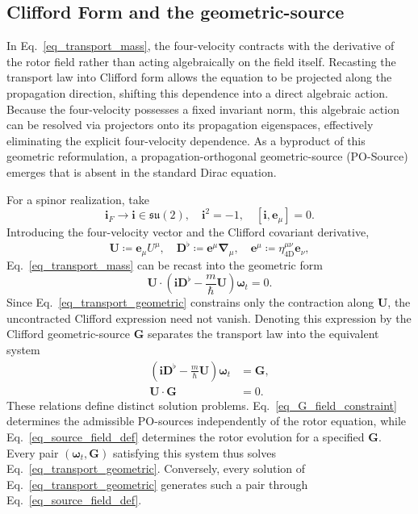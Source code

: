 \subsection{Clifford Form and the geometric-source}
In Eq.~\eqref{eq_transport_mass}, the four-velocity contracts with the derivative of the rotor field rather than acting algebraically on the field itself. Recasting the transport law into Clifford form allows the equation to be projected along the propagation direction, shifting this dependence into a direct algebraic action. Because the four-velocity possesses a fixed invariant norm, this algebraic action can be resolved via projectors onto its propagation eigenspaces, effectively eliminating the explicit four-velocity dependence. As a byproduct of this geometric reformulation, a propagation-orthogonal geometric-source (PO-Source) emerges that is absent in the standard Dirac equation.

For a spinor realization, take
\begin{equation}
    \mathbf{i}_{F} \to \mathbf{i}\in\mathfrak{su}(2),\quad \mathbf{i}^{2} = -1,\quad [\mathbf{i}, \mathbf{e}_{\mu}] = 0.
\end{equation}
Introducing the four-velocity vector and the Clifford covariant derivative,
\begin{equation}
    \mathbf{U} \coloneqq \mathbf{e}_{\mu}U^{\mu},\quad \mathbf{D}^{\flat} \coloneqq \mathbf{e}^{\mu}\boldsymbol{\nabla}_{\mu},\quad \mathbf{e}^{\mu} \coloneqq \eta_{\mathrm{4D}}^{\mu\nu}\mathbf{e}_{\nu},
\end{equation}
Eq.~\eqref{eq_transport_mass} can be recast into the geometric form
\begin{equation}\label{eq_transport_geometric}
    \mathbf{U}\cdot\left(\mathbf{i}\mathbf{D}^{\flat} - \frac{m}{\hbar}\mathbf{U}\right)\boldsymbol{\omega}_{t} = 0.
\end{equation}
Since Eq.~\eqref{eq_transport_geometric} constrains only the contraction along $\mathbf{U}$, the uncontracted Clifford expression need not vanish. Denoting this expression by the Clifford geometric-source $\mathbf{G}$ separates the transport law into the equivalent system
\begin{subequations}\label{eq_rotor_geometric_source_system}
    \begin{align}
        \left(\mathbf{i}\mathbf{D}^{\flat} - \frac{m}{\hbar}\mathbf{U}\right)\boldsymbol{\omega}_{t} &= \mathbf{G},\label{eq_source_field_def}\\
        \mathbf{U}\cdot\mathbf{G} &= 0.\label{eq_G_field_constraint}
    \end{align}
\end{subequations}
These relations define distinct solution problems. Eq.~\eqref{eq_G_field_constraint} determines the admissible PO-sources independently of the rotor equation, while Eq.~\eqref{eq_source_field_def} determines the rotor evolution for a specified $\mathbf{G}$. Every pair $(\boldsymbol{\omega}_{t}, \mathbf{G})$ satisfying this system thus solves Eq.~\eqref{eq_transport_geometric}. Conversely, every solution of Eq.~\eqref{eq_transport_geometric} generates such a pair through Eq.~\eqref{eq_source_field_def}.

